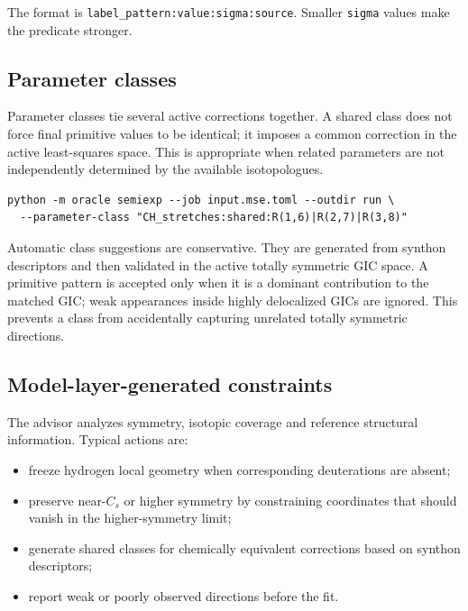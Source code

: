 \documentclass[11pt]{article}
\begin{document}
\noindent
The format is \texttt{label\_pattern:value:sigma:source}.  Smaller
\texttt{sigma} values make the predicate stronger.

\subsection{Parameter classes}

Parameter classes tie several active corrections together.  A shared class
does not force final primitive values to be identical; it imposes a common
correction in the active least-squares space.  This is appropriate when
related parameters are not independently determined by the available
isotopologues.

\begin{lstlisting}[style=oracle]
python -m oracle semiexp --job input.mse.toml --outdir run \
  --parameter-class "CH_stretches:shared:R(1,6)|R(2,7)|R(3,8)"
\end{lstlisting}

\noindent
Automatic class suggestions are conservative.  They are generated from
synthon descriptors and then validated in the active totally symmetric GIC
space.  A primitive pattern is accepted only when it is a dominant contribution
to the matched GIC; weak appearances inside highly delocalized GICs are
ignored.  This prevents a class from accidentally capturing unrelated
totally symmetric directions.

\subsection{Model-layer-generated constraints}

The advisor analyzes symmetry, isotopic coverage and reference structural
information.  Typical actions are:

\begin{itemize}
  \item freeze hydrogen local geometry when corresponding deuterations are
        absent;
  \item preserve near-\(C_s\) or higher symmetry by constraining coordinates
        that should vanish in the higher-symmetry limit;
  \item generate shared classes for chemically equivalent corrections based
        on synthon descriptors;
  \item report weak or poorly observed directions before the fit.
\end{itemize}
\end{document}
